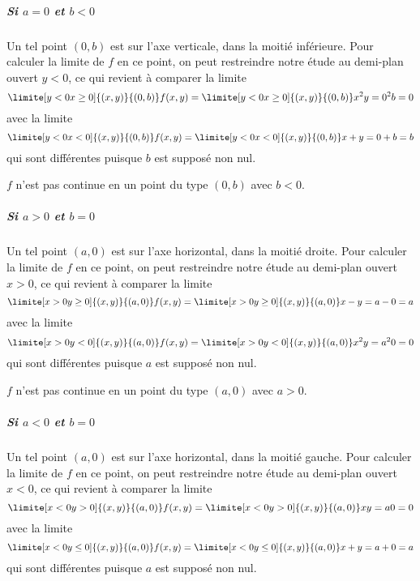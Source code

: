 \begin{example}
\subparagraph{Si $a = 0$ et $b < 0$} Un tel point $(0,b)$ est sur
l'axe verticale, dans la moitié inférieure. Pour calculer la limite de
$f$ en ce point, on peut restreindre notre étude au demi-plan ouvert
$y < 0$, ce qui revient à comparer la limite
\begin{equation*}
  \limite[y<0\\x\geq 0] {(x,y)} {(0,b)} f(x,y) =   \limite[y<0\\x\geq
  0] {(x,y)} {(0,b)} x^2 y = 0^2 b = 0
\end{equation*}
avec la limite
\begin{equation*}
  \limite[y<0\\x<0] {(x,y)} {(0,b)} f(x,y) =   \limite[y<0\\x<0]
  {(x,y)} {(0,b)} x+y = 0 + b = b
\end{equation*}
qui sont différentes puisque $b$ est supposé non nul.

\conclusion $f$ n'est pas continue en un point du type $(0,b)$ avec $b
< 0$.

\subparagraph{Si $a > 0$ et $b = 0$} Un tel point $(a,0)$ est sur
l'axe horizontal, dans la moitié droite. Pour calculer la limite de
$f$ en ce point, on peut restreindre notre étude au demi-plan ouvert
$x > 0$, ce qui revient à comparer la limite
\begin{equation*}
  \limite[x>0\\y \geq 0] {(x,y)} {(a,0)} f(x,y) =   \limite[x>0\\y \geq
  0] {(x,y)} {(a,0)} x-y = a - 0 = a
\end{equation*}
avec la limite
\begin{equation*}
  \limite[x>0\\y < 0] {(x,y)} {(a,0)} f(x,y) =   \limite[x>0\\y < 0]
  {(x,y)} {(a,0)} x^2y = a^2 0 = 0
\end{equation*}
qui sont différentes puisque $a$ est supposé non nul.

\conclusion $f$ n'est pas continue en un point du type $(a,0)$ avec $a
> 0$.

\subparagraph{Si $a < 0$ et $b = 0$} Un tel point $(a,0)$ est sur
l'axe horizontal, dans la moitié gauche. Pour calculer la limite de
$f$ en ce point, on peut restreindre notre étude au demi-plan ouvert
$x < 0$, ce qui revient à comparer la limite
\begin{equation*}
  \limite[x<0\\y> 0] {(x,y)} {(a,0)} f(x,y) =   \limite[x<0\\y>
  0] {(x,y)} {(a,0)} x y = a 0 = 0
\end{equation*}
avec la limite
\begin{equation*}
  \limite[x<0\\y\leq 0] {(x,y)} {(a,0)} f(x,y) =   \limite[x<0\\y\leq0]
  {(x,y)} {(a,0)} x+y = a + 0 = a
\end{equation*}
qui sont différentes puisque $a$ est supposé non nul.


\end{example}
